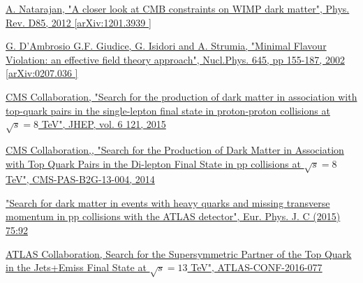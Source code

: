 \documentclass[a4paper, 10pt, openright]{report}
\begin{document}
\begin{thebibliography}{1}
\href{https://arxiv.org/abs/1201.3939}{A. Natarajan,
"A closer look at CMB constraints on WIMP dark matter",
Phys. Rev. D85, 2012 [arXiv:1201.3939 ]}

\href{https://arxiv.org/abs/hep-ph/0207036}{G. D'Ambrosio G.F. Giudice, G. Isidori and A. Strumia,
"Minimal Flavour Violation: an effective field theory approach",
Nucl.Phys. 645, pp 155-187, 2002 [arXiv:0207.036 ]}



\href{https://arxiv.org/abs/1504.03198}{CMS Collaboration,
"Search for the production of dark matter in association with top-quark pairs in the single-lepton final state in proton-proton collisions at $\sqrt{s} = 8$ TeV",
JHEP, vol. 6 121, 2015}

\href{http://inspirehep.net/record/1292446}{CMS Collaboration,,
"Search for the Production of Dark Matter in Association with Top Quark Pairs in the Di-lepton Final State in pp collisions at $\sqrt{s} = 8$ TeV",
CMS-PAS-B2G-13-004, 2014}

\href{https://arxiv.org/abs/1410.4031}{
"Search for dark matter in events with heavy quarks and missing transverse momentum in pp collisions with the ATLAS detector",
Eur. Phys. J. C (2015) 75:92}


\href{http://inspirehep.net/record/1480057}{ATLAS Collaboration,
Search for the Supersymmetric Partner of the Top Quark in the Jets+Emiss Final State at $\sqrt{s} = 13$ TeV",
ATLAS-CONF-2016-077
}


\end{thebibliography}
\end{document}

